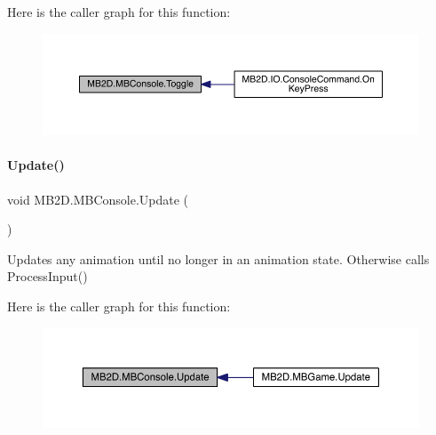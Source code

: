 Here is the caller graph for this function\+:
\nopagebreak
\begin{figure}[H]
\begin{center}
\leavevmode
\includegraphics[width=350pt]{class_m_b2_d_1_1_m_b_console_aab4c284a98afb148e35cf28e6d8ba0fc_icgraph}
\end{center}
\end{figure}
\hypertarget{class_m_b2_d_1_1_m_b_console_a4239aee536dc49bbbd59d81d79f24266}{}\label{class_m_b2_d_1_1_m_b_console_a4239aee536dc49bbbd59d81d79f24266} 
\paragraph{\texorpdfstring{Update()}{Update()}}
{\footnotesize\ttfamily void M\+B2\+D.\+M\+B\+Console.\+Update (\begin{DoxyParamCaption}{ }\end{DoxyParamCaption})\hspace{0.3cm}{\ttfamily [inline]}}



Updates any animation until no longer in an animation state. Otherwise calls Process\+Input() 

Here is the caller graph for this function\+:
\nopagebreak
\begin{figure}[H]
\begin{center}
\leavevmode
\includegraphics[width=350pt]{class_m_b2_d_1_1_m_b_console_a4239aee536dc49bbbd59d81d79f24266_icgraph}
\end{center}
\end{figure}
\hypertarget{class_m_b2_d_1_1_m_b_console_a1d85081cb5400f09883c1fc62f37d861}{}\label{class_m_b2_d_1_1_m_b_console_a1d85081cb5400f09883c1fc62f37d861} 
